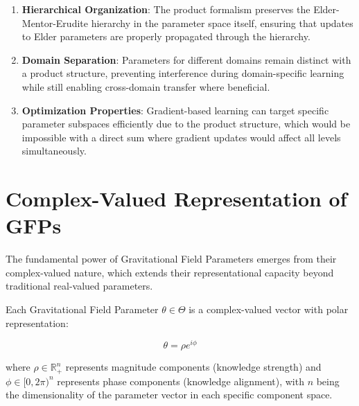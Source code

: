 \begin{definition}
\begin{enumerate}
    \item \textbf{Hierarchical Organization}: The product formalism preserves the Elder-Mentor-Erudite hierarchy in the parameter space itself, ensuring that updates to Elder parameters are properly propagated through the hierarchy.
    
    \item \textbf{Domain Separation}: Parameters for different domains remain distinct with a product structure, preventing interference during domain-specific learning while still enabling cross-domain transfer where beneficial.
    
    \item \textbf{Optimization Properties}: Gradient-based learning can target specific parameter subspaces efficiently due to the product structure, which would be impossible with a direct sum where gradient updates would affect all levels simultaneously.
\end{enumerate}
\end{definition}

\section{Complex-Valued Representation of GFPs}

The fundamental power of Gravitational Field Parameters emerges from their complex-valued nature, which extends their representational capacity beyond traditional real-valued parameters.

\begin{definition}
Each Gravitational Field Parameter $\theta \in \Theta$ is a complex-valued vector with polar representation:

\begin{equation}
\theta = \rho e^{i\phi}
\end{equation}

where $\rho \in \mathbb{R}^n_+$ represents magnitude components (knowledge strength) and $\phi \in [0, 2\pi)^n$ represents phase components (knowledge alignment), with $n$ being the dimensionality of the parameter vector in each specific component space.
\end{definition}

